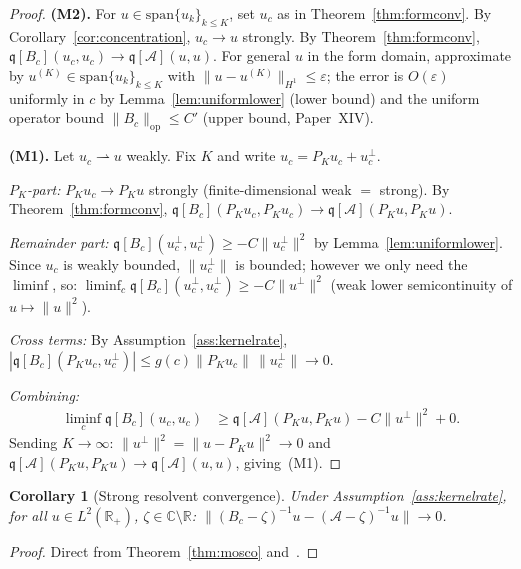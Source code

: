 \documentclass[12pt,a4paper]{amsart}
\newtheorem{corollary}[theorem]{Corollary}
\theoremstyle{definition}
\newcommand{\cA}{\mathcal{A}}
\newcommand{\R}{\mathbb{R}}
\newcommand{\C}{\mathbb{C}}
\newcommand{\op}{\mathrm{op}}
\begin{document}
\begin{proof}
\textbf{(M2).}
For $u\in\mathrm{span}\{u_k\}_{k\leq K}$,
set $u_c$ as in Theorem~\ref{thm:formconv}.
By Corollary~\ref{cor:concentration},
$u_c\to u$ strongly. By Theorem~\ref{thm:formconv},
$\mathfrak{q}[B_c](u_c,u_c)\to\mathfrak{q}[\cA](u,u)$.
For general $u$ in the form domain,
approximate by $u^{(K)}\in\mathrm{span}\{u_k\}_{k\leq K}$
with $\|u-u^{(K)}\|_{H^1}\leq\varepsilon$;
the error is $O(\varepsilon)$ uniformly in $c$
by Lemma~\ref{lem:uniformlower} (lower bound)
and the uniform operator bound $\|B_c\|_{\op}\leq C'$
(upper bound, Paper~XIV).

\textbf{(M1).}
Let $u_c\rightharpoonup u$ weakly. Fix $K$ and write
$u_c = P_K u_c + u_c^\perp$.

\emph{$P_K$-part:}
$P_K u_c\to P_K u$ strongly (finite-dimensional weak $=$ strong).
By Theorem~\ref{thm:formconv},
$\mathfrak{q}[B_c](P_K u_c,P_K u_c)\to\mathfrak{q}[\cA](P_K u,P_K u)$.

\emph{Remainder part:}
$\mathfrak{q}[B_c](u_c^\perp,u_c^\perp)\geq -C\|u_c^\perp\|^2$
by Lemma~\ref{lem:uniformlower}.
Since $u_c$ is weakly bounded, $\|u_c^\perp\|$ is bounded;
however we only need the $\liminf$, so:
$\liminf_c\mathfrak{q}[B_c](u_c^\perp,u_c^\perp)\geq -C\|u^\perp\|^2$
(weak lower semicontinuity of $u\mapsto\|u\|^2$).

\emph{Cross terms:}
By Assumption~\ref{ass:kernelrate},
$|\mathfrak{q}[B_c](P_K u_c, u_c^\perp)|
\leq g(c)\|P_K u_c\|\,\|u_c^\perp\|\to 0$.

\emph{Combining:}
\begin{align*}
  \liminf_c\mathfrak{q}[B_c](u_c,u_c)
  &\geq \mathfrak{q}[\cA](P_K u,P_K u)
    - C\|u^\perp\|^2 + 0.
\end{align*}
Sending $K\to\infty$:
$\|u^\perp\|^2 = \|u - P_K u\|^2\to 0$
and $\mathfrak{q}[\cA](P_K u,P_K u)\to\mathfrak{q}[\cA](u,u)$,
giving~(M1).
\end{proof}

\begin{corollary}[Strong resolvent convergence]
\label{cor:strongres}
Under Assumption~\ref{ass:kernelrate}, for all
$u\in L^2(\R_+)$, $\zeta\in\C\setminus\R$:
$\|(B_c-\zeta)^{-1}u - (\cA-\zeta)^{-1}u\|\to 0$.
\end{corollary}

\begin{proof}
Direct from Theorem~\ref{thm:mosco} and~\cite{Attouch1984}.
\end{proof}

\end{document}
